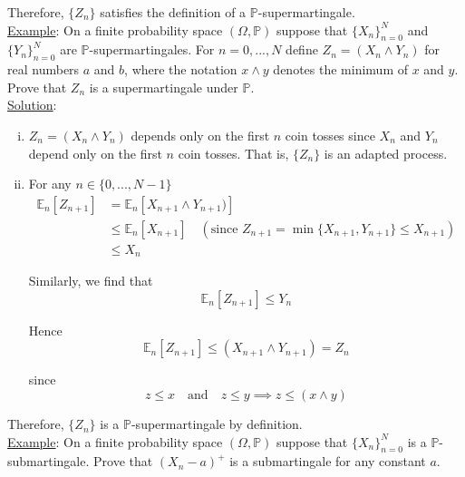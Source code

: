 \documentclass[12pt]{article}
\renewcommand{\P}{\mathbb P}
\newcommand{\E}{\mathbb E}
\begin{document}
Therefore, $\{Z_n\}$ satisfies the definition of a $\P$-supermartingale. \\

\underline{Example}: On a finite probability space $(\Omega, \P)$ suppose that $\{X_n\}^N_{n = 0}$ and $\{Y_n\}^N_{n = 0}$ are $\P$-supermartingales. For $n = 0, ..., N$ define $Z_n = (X_n \land Y_n)$ for real numbers $a$ and $b$, where the notation $x \land y$ denotes the minimum of $x$ and $y$. Prove that $Z_n$ is a supermartingale under $\P$. \\

\underline{Solution}:
\begin{enumerate}[(i)]
	\item $Z_n = (X_n \land Y_n)$ depends only on the first $n$ coin tosses since $X_n$ and $Y_n$ depend only on the first $n$ coin tosses. That is, $\{Z_n\}$ is an adapted process.
	\item For any $n \in \{0, ..., N - 1\}$
	\begin{align*}
		\E_n[Z_{n + 1}] &= \E_n[X_{n + 1} \land Y_{n + 1})] \\
		&\leq \E_n[X_{n + 1}] \quad (\text{since } Z_{n + 1} = \min  \{X_{n + 1}, Y_{n + 1}\} \leq X_{n + 1}) \\
		&\leq X_n
	\end{align*}
	
	Similarly, we find that 
	\begin{equation*}
		\E_n[Z_{n + 1}] \leq Y_n
	\end{equation*}
	
	Hence
	\begin{equation*}
		\E_n[Z_{n + 1}] \leq (X_{n + 1} \land Y_{n + 1}) = Z_n
	\end{equation*}
	
	since
	\begin{equation*}
		z \leq x \quad \text{and} \quad z \leq y \implies z \leq (x \land y)
	\end{equation*}
\end{enumerate}

Therefore, $\{Z_n\}$ is a $\P$-supermartingale by definition. \\


\underline{Example}: On a finite probability space $(\Omega, \P)$ suppose that $\{X_n\}^N_{n = 0}$ is a $\P$-submartingale. Prove that $(X_n - a)^+$ is a submartingale for any constant $a$. \\
\end{document}

